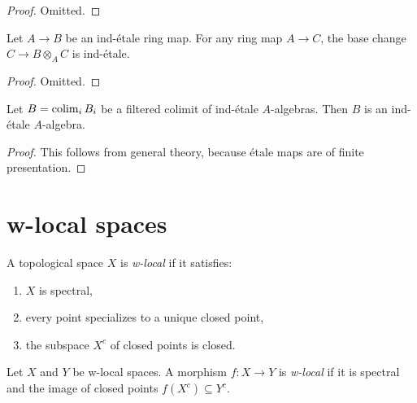 \begin{proof}
  Omitted.
\end{proof}

\begin{lemma}
  \label{thm:ind-etale-base-change}
  Let $A \to B$ be an ind-étale ring map. For any ring map $A \to C$, the base change $C \to B \otimes_A C$ is ind-étale.
\end{lemma}

\begin{proof}
  Omitted.
\end{proof}

\begin{lemma}
    Let $B = \operatorname{colim}_i B_i$ be a filtered colimit of ind-étale $A$-algebras. Then $B$ is
    an ind-étale $A$-algebra.
    \label{lemma:ind-ind-etale}
\end{lemma}

\begin{proof}
    This follows from general theory, because étale maps are of finite presentation.
\end{proof}

\section{w-local spaces}

\begin{definition}
    \label{def:w-local-space}
    \leanok
    A topological space \(X\) is \emph{w-local} if it satisfies:
    \begin{enumerate}
        \item \(X\) is spectral,
        \item every point specializes to a unique closed point,
        \item the subspace \(X^c\) of closed points is closed.
    \end{enumerate}
\end{definition}

\begin{definition}
    Let \(X\) and \(Y\) be w-local spaces. A morphism \(f: X \to Y\) is \emph{w-local} if it is spectral and the image of closed points \(f(X^c) \subseteq Y^c\).
    \label{def:w-local-space-map}
    \leanok
\end{definition}

